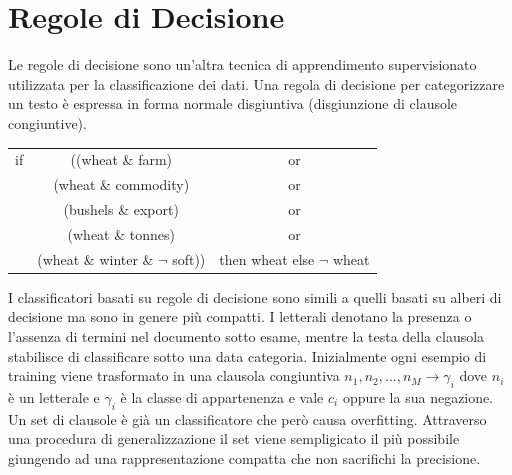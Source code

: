 \documentclass{report}
\begin{document}
	\section{Regole di Decisione}
	Le regole di decisione sono un'altra tecnica di apprendimento supervisionato utilizzata per la classificazione dei dati. Una regola di decisione per categorizzare un testo è espressa in forma normale disgiuntiva (disgiunzione di clausole congiuntive).
	\begin{table}[H]
		\centering
		\begin{tabular}{ccc}
			if & ((wheat \& farm) & or \\
			& (wheat \& commodity) & or \\
			& (bushels \& export) & or \\
			& (wheat \& tonnes) & or \\
			& (wheat \& winter \& $\neg$ soft)) & then wheat else $\neg$ wheat \\ 
		\end{tabular}
	\end{table}
	I classificatori basati su regole di decisione sono simili a quelli basati su alberi di decisione ma sono in genere più compatti. I letterali denotano la presenza o l'assenza di termini nel documento sotto esame, mentre la testa della clausola stabilisce di classificare sotto una data categoria. Inizialmente ogni esempio di training viene trasformato in una clausola congiuntiva $n_1, n_2, \ldots, n_M \rightarrow \gamma_i$ dove $n_i$ è un letterale e $\gamma_i$ è la classe di appartenenza e vale $c_i$ oppure la sua negazione. Un set di clausole è già un classificatore che però causa overfitting. Attraverso una procedura di generalizzazione il set viene sempligicato il più possibile giungendo ad una rappresentazione compatta che non sacrifichi la precisione.
	
\end{document}
